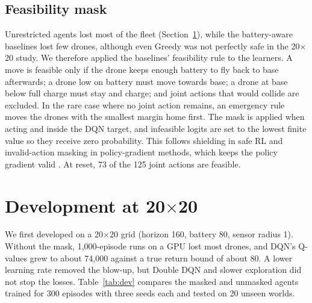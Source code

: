 \subsection{Feasibility mask}

Unrestricted agents lost most of the fleet (Section~\ref{sec:development}), while the
battery-aware baselines lost few drones, although even Greedy was not perfectly safe in the
20$\times$20 study. We therefore applied the baselines' feasibility rule to the learners. A move is feasible only if the drone keeps enough battery to fly back to base
afterwards; a drone low on battery must move towards base; a drone at base below full charge
must stay and charge; and joint actions that would collide are excluded. In the rare case
where no joint action remains, an emergency rule moves the drones with the smallest margin
home first. The mask is applied when acting and inside the DQN target, and infeasible logits
are set to the lowest finite value so they receive zero probability. This follows shielding
in safe RL \cite{alshiekh2018} and invalid-action masking in policy-gradient methods, which
keeps the policy gradient valid \cite{huang2022}. At reset, 73 of the 125 joint actions are
feasible.

\section{Development at 20$\times$20}
\label{sec:development}

We first developed on a 20$\times$20 grid (horizon 160, battery 80, sensor radius 1). Without
the mask, 1{,}000-episode runs on a GPU lost most drones, and DQN's Q-values grew to about
74{,}000 against a true return bound of about 80. A lower learning rate removed the blow-up,
but Double DQN \cite{vanhasselt2016} and slower exploration did not stop the losses.
Table~\ref{tab:dev} compares the masked and unmasked agents trained for 300 episodes with three
seeds each and tested on 20 unseen worlds.

